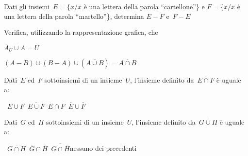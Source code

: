 
\begin{esercizio}
\label{ese:7.14}
Dati gli insiemi~$E=\{x / x$ è una lettera della parola ``cartellone''\} e
$F=\{x / x$ è una lettera della parola ``martello''\}, determina
$E-F$ e~$F-E$
\end{esercizio}


\begin{esercizio}
\label{ese:7.15}
Verifica, utilizzando la rappresentazione grafica, che
 \begin{enumeratea}
 \item $\overline{A}_{U}\cup A=U$
 \item $(A-B)\cup (B-A)\cup (\overline{A\cup B})=\overline{{A\cap B}}$
 \end{enumeratea}
\end{esercizio}

\begin{esercizio}
 \label{ese:7.16}
Dati~$E$ ed~$F$ sottoinsiemi di un insieme~$U$, l'insieme
definito da~$\overline{E\cap F}$ è uguale a:
\begin{center}
\boxA\quad~$E\cup F$\quad\boxB\quad~$\overline{E\cup F}$\quad\boxC\quad~$E\cap 
F$\quad\boxD\quad~$\overline{E}\cup\overline{F}$
\end{center}
\end{esercizio}

\begin{esercizio}
 \label{ese:7.17}
Dati~$G$ ed~$H$ sottoinsiemi di un insieme~$U$, l'insieme
definito da~$\overline{G\cup H}$ è uguale a:
\begin{center}
\boxA\quad~$\overline{{G\cap 
H}}$\quad\boxB\quad~$\overline{G}\cap\overline{H}$\quad\boxC\quad~$\overline{{
G\cap \overline{H}}}$\quad\boxD\quad nessuno dei precedenti
\end{center}
\end{esercizio}

